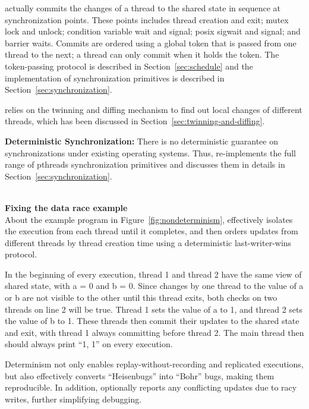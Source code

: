 \dthreads{} actually commits the changes of a thread to the shared state in sequence at synchronization points. These points includes thread creation and exit; mutex lock and unlock; condition variable wait and signal; posix sigwait and signal; and barrier waits. Commits are ordered using a global token that is passed from one thread to the next; a thread can only commit when it holds the token.  The token-passing protocol is described in Section~\ref{sec:schedule} and the implementation of synchronization primitives is described in Section~\ref{sec:synchronization}.

\dthreads{} relies on the twinning and diffing mechanism to find out local changes of different threads, which has been discussed in Section~\ref{sec:twinning-and-diffing}. 

\textbf{Deterministic Synchronization:}
There is no deterministic guarantee on synchronizations under existing operating systems. Thus, \dthreads{} re-implements the full range of pthreads synchronization primitives and discusses  them in details in Section~\ref{sec:synchronization}. 

\hspace{1em} \\
\noindent
\textbf{Fixing the data race example} \\
About the example program in Figure~\ref{fig:nondeterminism},  \dthreads{} effectively isolates the execution from each thread until it completes, and then orders updates from different threads by thread creation time using a deterministic last-writer-wins protocol.

In the beginning of every execution, thread 1 and thread 2 have the same view of shared state, with a = 0 and b = 0. Since changes by one thread to the value of a or b are not visible to the other until this thread exits, both checks on two threads on line 2 will be true. Thread 1 sets the value of a to 1, and thread 2 sets the value of b to 1. These threads then commit their updates to the shared state and exit, with thread 1 always committing before thread 2. The main thread then should always print ``1, 1'' on every execution.

Determinism not only enables replay-without-recording and replicated executions, but also effectively converts ``Heisenbugs'' into ``Bohr'' bugs, making them reproducible. In addition, \dthreads{} optionally reports any conflicting updates due to racy writes, further simplifying debugging.
